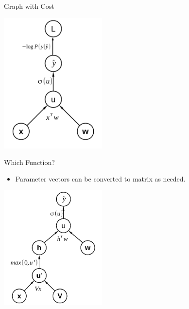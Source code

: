 \begin{vbframe}{Graph with Cost}

\vfill

\begin{center}
\includegraphics[width = 0.4\textwidth]{./figure/sigmoid_graph_with_loss}
\end{center}

\vfill

\end{vbframe}



\begin{vbframe}{Which Function?}

\vfill

\begin{itemize}
\item Parameter vectors can be converted to matrix as needed.
\end{itemize}
\begin{center}
\includegraphics[width = 0.4\textwidth]{./figure/relu_sigmoid_graph}
\end{center}

\vfill

\end{vbframe}


